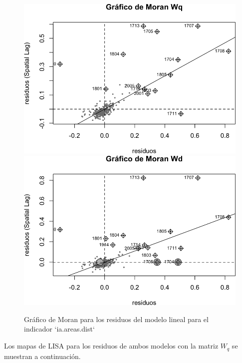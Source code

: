 \documentclass[12pt,]{book}
\begin{document}
\begin{figure}
\includegraphics[width=0.49\linewidth]{tesis-unigis_files/figure-latex/moranplot-resareasdist-w-1} \includegraphics[width=0.49\linewidth]{tesis-unigis_files/figure-latex/moranplot-resareasdist-w-2} \caption{Gráfico de Moran para los residuos del modelo lineal para el indicador `ia.areas.dist`}\label{fig:moranplot-resareasdist-w}
\end{figure}

Los mapas de LISA para los residuos de ambos modelos con la matriz
\(W_q\) se muestran a continuación.
\end{document}
